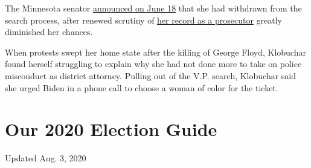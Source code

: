 The Minnesota senator
\href{https://www.nytimes.com/2020/06/18/us/politics/amy-klobuchar-biden-vice-president.html}{announced
on June 18} that she had withdrawn from the search process, after
renewed scrutiny of
\href{https://www.nytimes.com/2020/05/29/us/politics/klobuchar-minneapolis-george-floyd.html}{her
record as a prosecutor} greatly diminished her chances.

When protests swept her home state after the killing of George Floyd,
Klobuchar found herself struggling to explain why she had not done more
to take on police misconduct as district attorney. Pulling out of the
V.P. search, Klobuchar said she urged Biden in a phone call to choose a
woman of color for the ticket.

\hypertarget{our-2020-election-guide}{%
\section{Our 2020 Election Guide}\label{our-2020-election-guide}}

Updated Aug. 3, 2020

